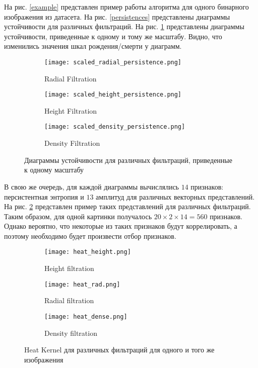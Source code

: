  На рис. \ref{example} представлен пример работы алгоритма для одного бинарного изображения из датасета. На рис. \ref{persistences} представлены диаграммы устойчивости для различных фильтраций. На рис. \ref{scaled_persistences} представлены диаграммы устойчивости, приведенные к одному и тому же масштабу. Видно, что изменились значения шкал рождения/смерти у диаграмм.


\begin{figure}[!htbp]
	\begin{subfigure}{.33\textwidth}
		\centering
		\texttt{[image: scaled\_radial\_persistence.png]}\\
		\caption{Radial Filtration}
	\end{subfigure}%
	\begin{subfigure}{.33\textwidth}
		\centering
		\texttt{[image: scaled\_height\_persistence.png]}\\
		\caption{Height Filtration}
	\end{subfigure}%
	\begin{subfigure}{.33\textwidth}
		\centering
		\texttt{[image: scaled\_density\_persistence.png]}\\
		\caption{Density Filtration}
	\end{subfigure}%
	\caption{Диаграммы устойчивости для различных фильтраций, приведенные к одному масштабу}
	\label{scaled_persistences}
\end{figure}

В свою же очередь, для каждой диаграммы вычислялись $14$ признаков: персистентная энтропия и $13$ амплитуд для различных векторных представлений. На рис. \ref{representations} представлен пример таких представлений для различных фильтраций. Таким образом, для одной картинки получалось $20 \times 2 \times 14 = 560$ признаков. Однако вероятно, что некоторые из таких признаков будут коррелировать, а поэтому необходимо будет произвести отбор признаков.

\begin{figure}[!htbp]
	\begin{subfigure}{.33\textwidth}
		\centering
		\texttt{[image: heat\_height.png]}\\
		\caption{Height filtration}
	\end{subfigure}%
	\begin{subfigure}{.33\textwidth}
		\centering
		\texttt{[image: heat\_rad.png]}\\
		\caption{Radial filtration}
	\end{subfigure}%
	\begin{subfigure}{.33\textwidth}
		\centering
		\texttt{[image: heat\_dense.png]}\\
		\caption{Density filtration}
	\end{subfigure}%
	\caption{Heat Kernel для различных фильтраций для одного и того же изображения}
	\label{representations}
\end{figure}

